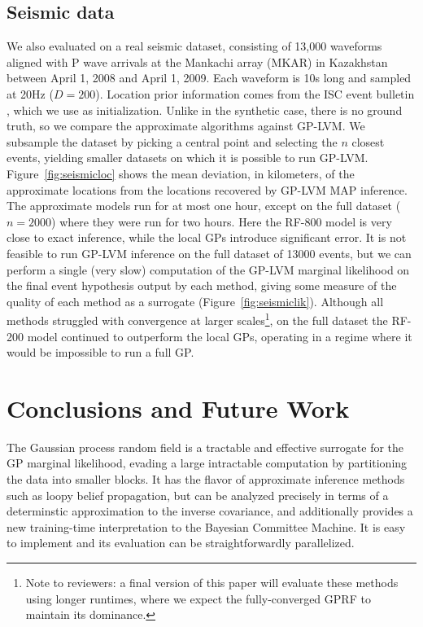 \documentclass{article}
\begin{document}
\subsection{Seismic data}
\vspace{-.5em}
We also evaluated on a real seismic dataset, consisting of 13,000 waveforms aligned with 
P wave arrivals at the Mankachi array (MKAR) in Kazakhstan
between  April 1, 2008 and
April 1, 2009. Each waveform is 10s long and sampled at 20Hz
($D=200$). Location prior information comes from the ISC event
bulletin \cite{ISCcitation2015}, which we use as initialization. 
Unlike in the synthetic case, there is no ground truth, so we compare 
the approximate algorithms against
GP-LVM. We subsample the dataset by picking a central
point and selecting the $n$ closest events, yielding smaller datasets
on which it is possible to run GP-LVM. Figure~\ref{fig:seismicloc}
shows the mean deviation, in kilometers, of the approximate locations from
the locations recovered by GP-LVM MAP inference. The approximate
models run for at most one hour, except on the full dataset ($n=2000$)
where they were run for two hours. Here the RF-800 model is very close
to exact inference, while the local GPs introduce significant
error. It is not feasible to run GP-LVM inference on the full dataset of 13000 events, but we can perform a single (very slow) computation
of the GP-LVM marginal likelihood on the final event hypothesis output
by each method, giving some measure of the quality of each method as a
surrogate (Figure~\ref{fig:seismiclik}). Although all methods struggled
with convergence at larger scales\footnote{Note to reviewers: a final
  version of this paper will evaluate these methods using longer
  runtimes, where we expect the fully-converged GPRF to maintain its
  dominance.}, on the full dataset the RF-200 model continued to outperform the local GPs,
operating in a regime where it would be impossible to run a full GP. 

\section{Conclusions and Future Work}
\vspace{-.5em}
The Gaussian process random field is a tractable and effective
surrogate for the GP marginal likelihood, evading a large intractable
computation by partitioning the data into smaller blocks. It has the flavor of
approximate inference methods such as loopy belief propagation, but
can be analyzed precisely in terms of a determinstic approximation to
the inverse covariance, and additionally provides a new training-time
interpretation to the Bayesian Committee Machine. It is easy to
implement and its evaluation can be straightforwardly parallelized. 
\end{document}
